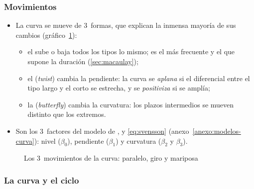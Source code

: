 \documentclass[11pt]{article}
\begin{document}
\subsubsection{Movimientos}\label{sec:movimientos}

\begin{itemize}
\item La curva se mueve de 3~formas, que explican la inmensa mayoría de sus cambios\nocite{LittermanScheinkman1991Common} (gráfico~\ref{fig:movimientos-curva}):
  \begin{itemize}
  \item el  sube o baja todos los tipos lo mismo; es el más frecuente y el que supone la duración (\ref{sec:macaulay});
  \item el  (\emph{twist}) cambia la pendiente: la curva se \emph{aplana} si el diferencial entre el tipo largo y el corto se estrecha, y se \emph{positiviza} si se amplía;
  \item la  (\emph{butterfly}) cambia la curvatura: los plazos intermedios se mueven distinto que los extremos.
  \end{itemize}
\item Son los 3~factores del modelo de ,  y  \eqref{eq:svensson} (anexo~\ref{anexo:modelos-curva}): nivel ($\beta_0$), pendiente ($\beta_1$) y curvatura ($\beta_2$ y $\beta_3$).
\end{itemize}

\begin{figure}[H]
\centering
\caption{Los 3~movimientos de la curva: paralelo, giro y mariposa}\label{fig:movimientos-curva}
\end{figure}

\subsubsection{La curva y el ciclo}\label{sec:ciclo}
\end{document}
